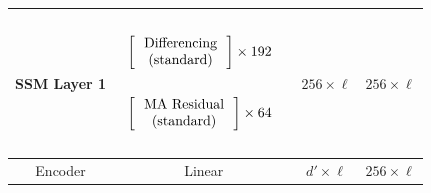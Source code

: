 \begin{table}[]
\begin{tabular}{@{}c|c|c|c@{}}
SSM Layer 1 & \begin{math}\begin{aligned}    \begin{matrix}    \text{\phantom{-}} \\    \end{matrix}    \\    &    \begin{bmatrix}    \text{\phantom{-} Differencing \phantom{-}}   \\ \text{(standard)} \\    \end{bmatrix}    \times 192     \\    \begin{matrix}    \text{\phantom{-}} \\    \end{matrix}    \\    &    \begin{bmatrix}    \text{\phantom{-} MA Residual\phantom{-} }   \\ \text{(standard)} \\    \end{bmatrix}     \times 64      \\     \begin{matrix}    \text{\phantom{-}} \\    \end{matrix}    \\\end{aligned}\end{math} & $256 \times \ell$ & $256 \times \ell$ \\ \midrule
Encoder     & Linear                                                                                                                                                                                                                                                                                                                                                                                                                                                                                                                                       & $d' \times \ell$  & $256 \times \ell$ \\ \bottomrule
\end{tabular}
\end{table}



